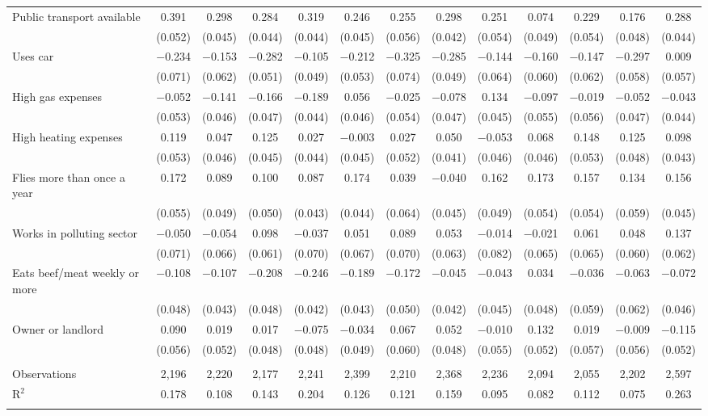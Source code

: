 \begin{tabular}{@{\extracolsep{5pt}}lcccccccccccc}
  Public transport available & 0.391 & 0.298 & 0.284 & 0.319 & 0.246 & 0.255 & 0.298 & 0.251 & 0.074 & 0.229 & 0.176 & 0.288 \\ 
  & (0.052) & (0.045) & (0.044) & (0.044) & (0.045) & (0.056) & (0.042) & (0.054) & (0.049) & (0.054) & (0.048) & (0.044) \\ 
  Uses car & $-$0.234 & $-$0.153 & $-$0.282 & $-$0.105 & $-$0.212 & $-$0.325 & $-$0.285 & $-$0.144 & $-$0.160 & $-$0.147 & $-$0.297 & 0.009 \\ 
  & (0.071) & (0.062) & (0.051) & (0.049) & (0.053) & (0.074) & (0.049) & (0.064) & (0.060) & (0.062) & (0.058) & (0.057) \\ 
  High gas expenses & $-$0.052 & $-$0.141 & $-$0.166 & $-$0.189 & 0.056 & $-$0.025 & $-$0.078 & 0.134 & $-$0.097 & $-$0.019 & $-$0.052 & $-$0.043 \\ 
  & (0.053) & (0.046) & (0.047) & (0.044) & (0.046) & (0.054) & (0.047) & (0.045) & (0.055) & (0.056) & (0.047) & (0.044) \\ 
  High heating expenses & 0.119 & 0.047 & 0.125 & 0.027 & $-$0.003 & 0.027 & 0.050 & $-$0.053 & 0.068 & 0.148 & 0.125 & 0.098 \\ 
  & (0.053) & (0.046) & (0.045) & (0.044) & (0.045) & (0.052) & (0.041) & (0.046) & (0.046) & (0.053) & (0.048) & (0.043) \\ 
  Flies more than once a year & 0.172 & 0.089 & 0.100 & 0.087 & 0.174 & 0.039 & $-$0.040 & 0.162 & 0.173 & 0.157 & 0.134 & 0.156 \\ 
  & (0.055) & (0.049) & (0.050) & (0.043) & (0.044) & (0.064) & (0.045) & (0.049) & (0.054) & (0.054) & (0.059) & (0.045) \\ 
  Works in polluting sector & $-$0.050 & $-$0.054 & 0.098 & $-$0.037 & 0.051 & 0.089 & 0.053 & $-$0.014 & $-$0.021 & 0.061 & 0.048 & 0.137 \\ 
  & (0.071) & (0.066) & (0.061) & (0.070) & (0.067) & (0.070) & (0.063) & (0.082) & (0.065) & (0.065) & (0.060) & (0.062) \\ 
  Eats beef/meat weekly or more & $-$0.108 & $-$0.107 & $-$0.208 & $-$0.246 & $-$0.189 & $-$0.172 & $-$0.045 & $-$0.043 & 0.034 & $-$0.036 & $-$0.063 & $-$0.072 \\ 
  & (0.048) & (0.043) & (0.048) & (0.042) & (0.043) & (0.050) & (0.042) & (0.045) & (0.048) & (0.059) & (0.062) & (0.046) \\ 
  Owner or landlord & 0.090 & 0.019 & 0.017 & $-$0.075 & $-$0.034 & 0.067 & 0.052 & $-$0.010 & 0.132 & 0.019 & $-$0.009 & $-$0.115 \\ 
  & (0.056) & (0.052) & (0.048) & (0.048) & (0.049) & (0.060) & (0.048) & (0.055) & (0.052) & (0.057) & (0.056) & (0.052) \\ 
 \hline \\[-1.8ex] 

Observations & 2,196 & 2,220 & 2,177 & 2,241 & 2,399 & 2,210 & 2,368 & 2,236 & 2,094 & 2,055 & 2,202 & 2,597 \\ 
R$^{2}$ & 0.178 & 0.108 & 0.143 & 0.204 & 0.126 & 0.121 & 0.159 & 0.095 & 0.082 & 0.112 & 0.075 & 0.263 \\ 
\hline 
\hline \\[-1.8ex] 
\end{tabular} 
